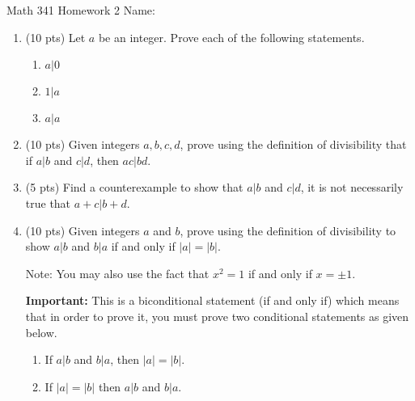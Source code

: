 \documentclass[12pt]{article}
\begin{document}
	Math 341 Homework 2
	\hfill
	Name: \underline{\hspace*{2in}}
	\begin{enumerate}
		\item (10 pts) Let $a$ be an integer. Prove each of the following statements.
			\begin{enumerate}
				\item $a|0$\vfill 
				\item $1|a$\vfill 
				\item $a|a$\vfill 
			\end{enumerate}
		\newpage
	\item (10 pts) Given integers $a,b,c,d$, prove using the definition of divisibility that if $a|b$ and $c|d$, then $ac|bd$.
	\vfill 
	\item (5 pts) Find a counterexample to show that $a|b$ and $c|d$, it is not necessarily true that $a+c|b+d$.\vfill
	\newpage 
	\item (10 pts) Given integers $a$ and $b$, prove using the definition of divisibility to show $a|b$ and $b|a$ if and only if $|a|=|b|$.
	
	Note: You may also use the fact that $x^2=1$ if and only if $x=\pm 1$.
	
	\textbf{Important:} This is a biconditional statement (if and only if) which means that in order to prove it, you must prove two conditional statements as given below.
		\begin{enumerate}
			\item If $a|b$ and $b|a$, then $|a|=|b|$.\vfill
			\item If $|a|=|b|$ then $a|b$ and $b|a$.\vfill
		\end{enumerate}
	\end{enumerate}
\end{document}
